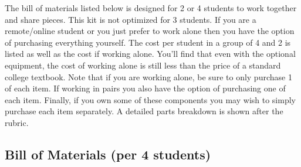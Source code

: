 \documentclass{article}
\begin{document}
The bill of materials listed below is designed for 2 or 4 students to work together and share
pieces. This kit is not optimized for 3 students. If you are a remote/online student or you just
prefer to work alone then you have the option of purchasing everything yourself. The cost per
student in a group of 4 and 2 is listed as well as the cost if working alone. You’ll find that even
with the optional equipment, the cost of working alone is still less than the price of a standard
college textbook. Note that if you are working alone, be sure to only purchase 1 of each item. If
working in pairs you also have the option of purchasing one of each item. Finally, if you own
some of these components you may wish to simply purchase each item separately. A detailed
parts breakdown is shown after the rubric.

\subsection{Bill of Materials (per 4 students)}
\end{document}
